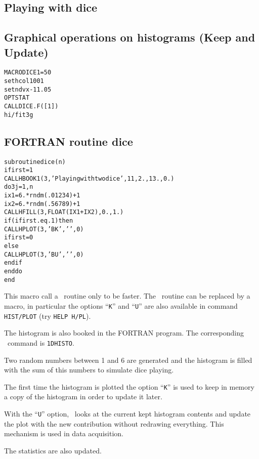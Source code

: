 \clearpage

\subsection{Playing with dice}
\subsection*{Graphical operations on histograms (Keep and Update)}
\begin{alltt}
      MACRO DICE 1=50
      set hcol 1001
      set ndvx -11.05
     OPT STAT
     CALL DICE.F([1])
      hi/fit 3 g
\end{alltt}
\subsection*{FORTRAN routine dice}
\begin{alltt}
      subroutine dice(n)
      ifirst=1
       CALL HBOOK1(3,'Playing with two dice',11,2.,13.,0.)
        do 3 j=1,n
          ix1=6.*rndm(.01234)+1
          ix2=6.*rndm(.56789)+1
         CALL HFILL(3,FLOAT(IX1+IX2),0.,1.)
          if (ifirst.eq.1) then
            CALL HPLOT(3,'BK',' ',0)
             ifirst=0
          else
            CALL HPLOT(3,'BU',' ',0)
          endif
        enddo
      end
\end{alltt} 
\begin{DinglistE}
\item This macro call a \COMIS\ routine only to be faster. The \COMIS\
      routine can be replaced by a macro, in particular the options
      ``{\tt K}'' and
      ``{\tt U}'' are also available in command {\tt HIST/PLOT}
      (try {\tt HELP H/PL}).
\item The histogram is also booked in the FORTRAN program. The corresponding
      \PAW\ command is {\tt 1DHISTO}.
\item Two random numbers between 1 and 6 are generated and the histogram
      is filled with the sum of this numbers to simulate dice playing.
\item The first time the histogram is plotted the option ``{\tt K}'' is used
      to keep in memory a copy of the histogram in order to update it later.
\item With the ``{\tt U}'' option, \PAW\ looks at the current kept histogram
      contents and update the plot with the new contribution without redrawing
      everything. This mechanism is used in data acquisition.
\item The statistics are also updated.
\end{DinglistE}
\clearpage
\mbox{}


